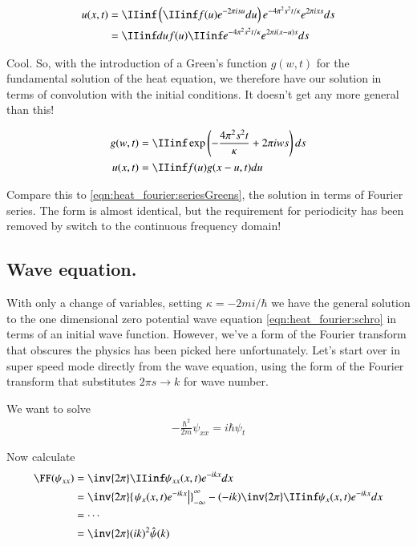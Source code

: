 \begin{align*}
u(x,t) 
&= 
\IIinf \left( 
\IIinf f(u) e^{-2 \pi i s u } du \right) e^{ -4 \pi^2 s^2 t/ \kappa } e^{2 \pi i x s } ds  \\
&= 
\IIinf du f(u) 
\IIinf e^{ -4 \pi^2 s^2 t/ \kappa } e^{2 \pi i (x - u) s } ds  \\
\end{align*}

Cool.  So, with the introduction of a Green's function $g(w,t)$ for the fundamental solution of the heat equation, we therefore have
our solution in terms of convolution with the initial conditions.  It doesn't get any more general than this!

\begin{align}
g(w,t) &= 
\IIinf \exp\left( -\frac{4 \pi^2 s^2 t}{\kappa} + 2 \pi i w s \right) ds \\
u(x,t) &= \IIinf f(u) g( x - u, t) du
\end{align}

Compare this to \ref{eqn:heat_fourier:seriesGreens}, the solution in terms of Fourier series.  The form is almost identical, but the requirement for periodicity has been removed by switch to the continuous frequency domain!

\subsection{Wave equation. }

With only a change of variables, setting $\kappa = - 2 m i /\hbar$ we have the general solution to the one dimensional zero potential wave equation \ref{eqn:heat_fourier:schro} in terms of an initial wave function.  However, we've a form of the Fourier transform that obscures the physics has been picked here unfortunately.  Let's start over in super speed mode directly from the wave equation, using the form of the Fourier transform that substitutes $2\pi s \rightarrow k$ for wave number.

We want to solve
\begin{align*}
-\frac{\hbar^2}{2m} \psi_{xx} = i \hbar \psi_t
\end{align*}

Now calculate
\begin{align*}
\FF(\psi_{xx}) 
&= \inv{2\pi} \IIinf \psi_{xx}(x,t) e^{-i k x} dx \\
&= 
\inv{2\pi} {\left.\psi_{x}(x,t) e^{-i k x} \right\vert}_{-\infty}^\infty 
-(- i k) \inv{2\pi} \IIinf \psi_{x}(x,t) e^{-i k x} dx \\
&= \cdots \\
&= \inv{2\pi} (i k)^2 \hat{\psi}(k)
\end{align*}

